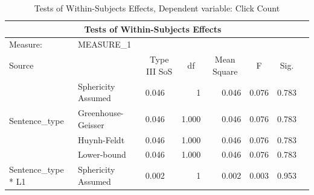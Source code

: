 \documentclass[a4paper]{article}
\begin{document}
\begin{table}[H]
\begin{center}
\caption{Tests of Within-Subjects Effects, Dependent variable: Click Count}
\label{tab:withinclickcount}
\begin{tabular}{p{}p{}|l|r|r|r|r|r|} 
\hline
\multicolumn{7}{|c|}{Tests of Within-Subjects Effects}                                                                                                                                                                                         \\ 
\hline
Measure:~                                               & MEASURE\_1         & \multicolumn{1}{l|}{}                        & \multicolumn{1}{l|}{}   & \multicolumn{1}{l|}{}            & \multicolumn{1}{l|}{}  & \multicolumn{1}{l|}{}      \\ 
\hline
Source                                                  & ~                  & \multicolumn{1}{c|}{Type III SoS} & \multicolumn{1}{c|}{df} & \multicolumn{1}{c|}{Mean Square} & \multicolumn{1}{c|}{F} & \multicolumn{1}{c|}{Sig.}  \\ 
\hline
\multirow{4}{*}{Sentence\_type}                         & Sphericity Assumed & 0.046                                        & 1                       & 0.046                            & 0.076                  & 0.783                      \\ 
\cline{2-7}
                                                        & Greenhouse-Geisser & 0.046                                        & 1.000                   & 0.046                            & 0.076                  & 0.783                      \\ 
\cline{2-7}
                                                        & Huynh-Feldt        & 0.046                                        & 1.000                   & 0.046                            & 0.076                  & 0.783                      \\ 
\cline{2-7}
                                                        & Lower-bound        & 0.046                                        & 1.000                   & 0.046                            & 0.076                  & 0.783                      \\ 
\hline
\multirow{4}{*}{Sentence\_type * L1}                    & Sphericity Assumed & 0.002                                        & 1                       & 0.002                            & 0.003                  & 0.953                      \\ 

\end{tabular}
\end{center}
\end{table}
\end{document}
